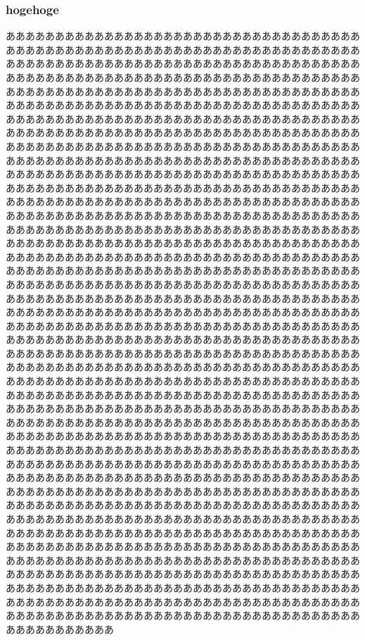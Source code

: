 \documentclass{jsarticle}
\begin{document}
\begin{multicols}{2}
      \subsubsection{hogehoge}
      あああああああああああああああああああああああああああああああああああああああああああああああああああああああああああああああああああああああああああああああああああああああああああああああああああああああああああああああああああああああああああああああああああああああああああああああああああああああああああああああああああああああああああああああああああああああああああああああああああああああああああああああああああああああああああああああああああああああああああああああああああああああああああああああああああああああああああああああああああああああああああああああああああああああああああああああああああああああああああああああああああああああああああああああああああああああああああああああああああああああああああああああああああああああああああああああああああああああああああああああああああああああああああああああああああああああああああああああああああああああああああああああああああああああああああああああああああああああああああああああああああああああああああああああああああああああああああああああああああああああああああああああああああああああああああああああああああああああああああああああああああああああああああああああああああああああああああああああああああああああああああああああああああああああああああああああああああああああああああああああああああああああああああああああああああああああああああああああああああああああああああああああああああああああああああああああああああああああああああああああああああああああああああああああああああああああああああああああああああああああああああああああああああああああああああああああああああああああああああああああああああああああああああああああああああああああああああああああああああああああああああああああああああああああああああああああああああああああああああああああああああああああああああああああああああああああああああああああああああああああああああああああああああああああああああああああああああああああああああああああああああああああああああああああああああああああああああああああああああああああああああああああああああああああああああああああああああああああああああああああああああああああああああああああああああああああああああああああああああああああああああああああああああああああああああああああああああああああああああああああああああああああああああああああああああああああああああああああああああああああああああああああああああああああああああああああああああああああああああああああああああああああああああああああああああああああああああああああああああああああああああああああああああああああああああああああああああああああああああああああああああああああああああああああああああああああああああああああああああああああああああああああああああああああああああああああああああああああああああああああああああああああああああああああああああああああああああああああああああああああああああああああああああああああああああああああああああああああああああああああああああああああああああああああああああああああああああああああああああああああああああああああああああああああああああああああああああああああああああああああああああああああああああああああああああああああああああああああああああああああ
\end{multicols}
\end{document}
